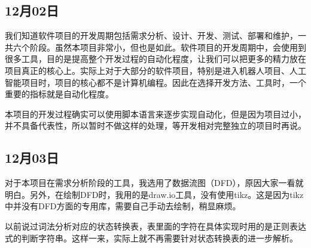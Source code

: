 \subsection{12月02日}
我们知道软件项目的开发周期包括需求分析、设计、开发、测试、部署和维护，一共六个阶段。虽然本项目非常小，但也是如此。软件项目的开发周期中，会使用到很多工具，目的是提高整个开发过程的自动化程度，让我们可以把更多的精力放在项目真正的核心上。实际上对于大部分的软件项目，特别是进入机器人项目、人工智能项目时，项目的核心都不是计算机编程。因此在选择开发方法、工具时，一个重要的指标就是自动化程度。

本项目的开发过程确实可以使用脚本语言来逐步实现自动化，但是因为项目过小，并不具备代表性，所以暂时不做这样的处理，等开发相对完整独立的项目时再说。


\subsection{12月03日}
对于本项目在需求分析阶段的工具，我选用了数据流图（DFD），原因大家一看就明白。另外，在绘制DFD时，我用的是draw.io工具，没有使用tikz。这是因为tikz中并没有DFD方面的专用库，需要自己手动去绘制，稍显麻烦。

以前说过词法分析对应的状态转换表，表里面的字符在具体实现时用的是正则表达式的判断字符串。这样一来，实际上就不再需要针对状态转换表的进一步解析。